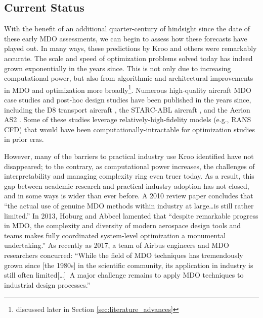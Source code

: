 \documentclass[12pt,vi,oneside]{report}
\begin{document}
    \subsection*{Current Status}

    With the benefit of an additional quarter-century of hindsight since the date of these early MDO assessments, we can begin to assess how these forecasts have played out. In many ways, these predictions by Kroo and others were remarkably accurate. The scale and speed of optimization problems solved today has indeed grown exponentially in the years since. This is not only due to increasing computational power, but also from algorithmic and architectural improvements in MDO and optimization more broadly\footnote{discussed later in Section \ref{sec:literature_advances}}. Numerous high-quality aircraft MDO case studies and post-hoc design studies have been published in the years since, including the D8 transport aircraft \cite{drela_development_2011, drela_tasopt_2010}, the STARC-ABL aircraft \cite{yildirim_performance_2021}, and the Aerion AS2 \cite{bons_highfidelity_2020}. Some of these studies leverage relatively-high-fidelity models (e.g., RANS CFD) that would have been computationally-intractable for optimization studies in prior eras.

    However, many of the barriers to practical industry use Kroo identified have not disappeared; to the contrary, as computational power increases, the challenges of interpretability and managing complexity ring even truer today. As a result, this gap between academic research and practical industry adoption has not closed, and in some ways is wider than ever before. A 2010 review paper \cite{agte_mdo_2010} concludes that ``the actual use of genuine MDO methods within industry at large\dots is still rather limited.'' In 2013, Hoburg and Abbeel lamented that ``despite remarkable progress in MDO, the complexity and diversity of modern aerospace design tools and teams makes fully coordinated system-level optimization a monumental undertaking.'' \cite{hoburg_geometric_2014} As recently as 2017, a team of Airbus engineers and MDO researchers concurred: ``While the field of MDO techniques has tremendously grown since [the 1980s] in the scientific community, its application in industry is still often limited[\dots]\ A major challenge remains to apply MDO techniques to industrial design processes.'' \cite{gazaix_industrialization_2017}

\end{document}
